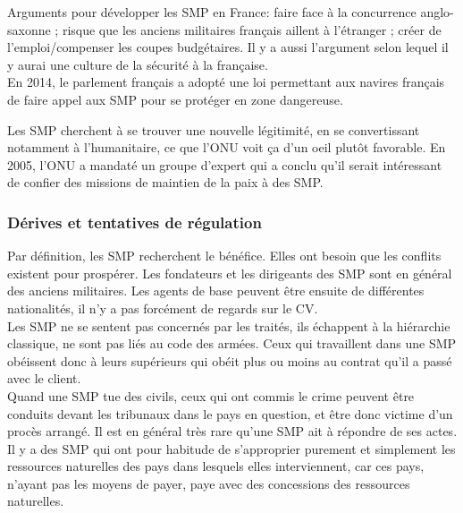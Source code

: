 \documentclass[10pt, a4paper, openany]{book}
\begin{document}
Arguments pour développer les SMP en France: faire face à la concurrence anglo-saxonne ; risque que les anciens militaires français aillent à l'étranger ; créer de l'emploi/compenser les coupes budgétaires. Il y a aussi l'argument selon lequel il y aurai une culture de la sécurité à la française. \\
En 2014, le parlement français a adopté une loi permettant aux navires français de faire appel aux SMP pour se protéger en zone dangereuse. 


Les SMP cherchent à se trouver une nouvelle légitimité, en se convertissant notamment à l'humanitaire, ce que l'ONU voit ça d'un oeil plutôt favorable. En 2005, l'ONU a mandaté un groupe d'expert qui a conclu qu'il serait intéressant de confier des missions de maintien de la paix à des SMP. 


\subsubsection{Dérives et tentatives de régulation}

Par définition, les SMP recherchent le bénéfice. Elles ont besoin que les conflits existent pour prospérer. Les fondateurs et les dirigeants des SMP sont en général des anciens militaires. Les agents de base peuvent être ensuite de différentes nationalités, il n'y a pas forcément de regards sur le CV. \\
Les SMP ne se sentent pas concernés par les traités, ils échappent à la hiérarchie classique, ne sont pas liés au code des armées. Ceux qui travaillent dans une SMP obéissent donc à leurs supérieurs qui obéit plus ou moins au contrat qu'il a passé avec le client. \\
Quand une SMP tue des civils, ceux qui ont commis le crime peuvent être conduits devant les tribunaux dans le pays en question, et être donc victime d'un procès arrangé. Il est en général très rare qu'une SMP ait à répondre de ses actes. \\
Il y a des SMP qui ont pour habitude de s'approprier purement et simplement les ressources naturelles des pays dans lesquels elles interviennent, car ces pays, n'ayant pas les moyens de payer, paye avec des concessions des ressources naturelles.
\end{document}
